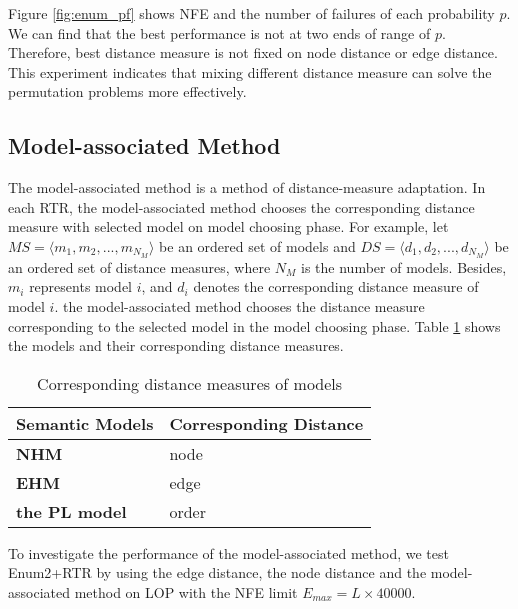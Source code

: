 Figure \ref{fig:enum_pf} shows NFE and the number of failures of each probability $p$. We can find that the best performance is not at two ends of range of $p$. Therefore, best distance measure is not fixed on node distance or edge distance. This experiment indicates that mixing different distance measure can solve the permutation problems more effectively.

\subsection{Model-associated Method}
The model-associated method is a method of distance-measure adaptation. In each RTR, the model-associated method chooses the corresponding distance measure with selected model on model choosing phase. For example, let $MS=\langle m_1 , m_2, ..., m_{N_M}\rangle$ be an ordered set of models and $DS=\langle d_1 , d_2, ..., d_{N_M}\rangle$ be an ordered set of distance measures, where ${N_M}$ is the number of models. Besides, $m_i$ represents model $i$, and $d_i$ denotes the corresponding distance measure of model $i$. the model-associated method chooses the distance measure corresponding to the selected model in the model choosing phase. Table \ref{tb:model_distance} shows the models and their corresponding distance measures.


\begin{table}[htbp]
    \centering
    \begin{tabular}{|l|l|}
    \hline
    \textbf{Semantic Models}       & \textbf{Corresponding Distance}  \\ \hline
    \textbf{NHM} & node     	 \\ \hline
    \textbf{EHM} & edge   	\\ \hline
    \textbf{the PL model} & order   	\\ \hline
  
    \end{tabular} 
    \caption{Corresponding distance measures of models}
    \label{tb:model_distance}
\end{table}

To investigate the performance of the model-associated method, we test Enum2+RTR by using the edge distance, the node distance and the model-associated method on LOP with the NFE limit $E_{max} = L \times 40000$. %
